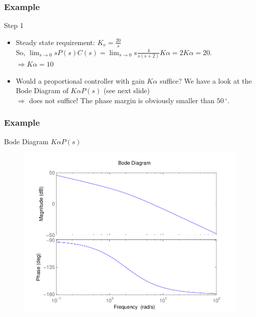 \begin{frame}
\frametitle{Example}
\begin{block}{Step 1}
\begin{itemize}	
\item Steady state requirement: $K_v = \frac{20}{s}$ \\
So, $\lim_{s \to 0} sP(s)C(s) = \lim_{s \to 0} s\frac{4}{s(s+2)}K\alpha = 2K\alpha = 20$. \\
$\Rightarrow K\alpha = 10$
\item Would a proportional controller with gain $K\alpha$ suffice? We have a look at the Bode Diagram of $K\alpha P(s)$ (see next slide) \\
$\Rightarrow$ does not suffice! The phase margin is obviously smaller than $50\,^{\circ}$.
\end{itemize}
\end{block}
\end{frame}

\begin{frame}
\frametitle{Example}
\begin{block}{Bode Diagram $K\alpha P(s)$}
	\begin{figure}
		\centering
		\includegraphics[width=0.6
		\linewidth]{bodeleadexamplestep1}
	\end{figure}
\end{block}
\end{frame}


